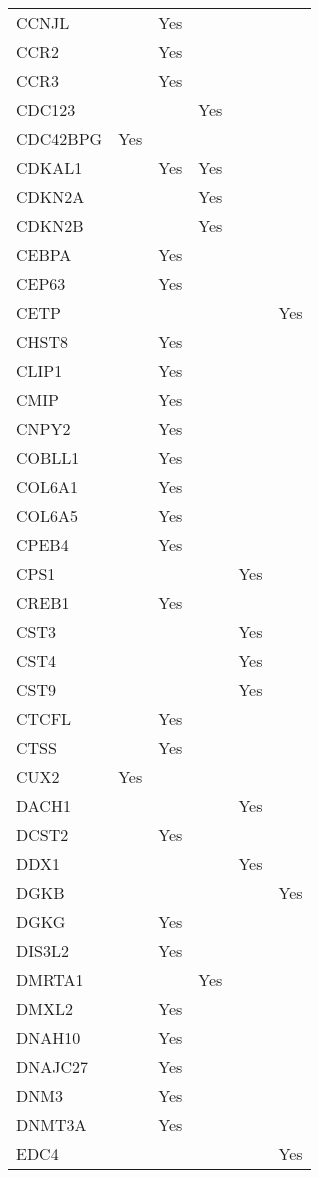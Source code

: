\documentclass[twoside,openright]{report}
\begin{document}
\begin{appendices}
\begin{longtable}[t]{llllll}
CCNJL &  & Yes &  &  & \\
CCR2 &  & Yes &  &  & \\
CCR3 &  & Yes &  &  & \\
CDC123 &  &  & Yes &  & \\
CDC42BPG & Yes &  &  &  & \\
CDKAL1 &  & Yes & Yes &  & \\
CDKN2A &  &  & Yes &  & \\
CDKN2B &  &  & Yes &  & \\
CEBPA &  & Yes &  &  & \\
CEP63 &  & Yes &  &  & \\
CETP &  &  &  &  & Yes\\
CHST8 &  & Yes &  &  & \\
CLIP1 &  & Yes &  &  & \\
CMIP &  & Yes &  &  & \\
CNPY2 &  & Yes &  &  & \\
COBLL1 &  & Yes &  &  & \\
COL6A1 &  & Yes &  &  & \\
COL6A5 &  & Yes &  &  & \\
CPEB4 &  & Yes &  &  & \\
CPS1 &  &  &  & Yes & \\
CREB1 &  & Yes &  &  & \\
CST3 &  &  &  & Yes & \\
CST4 &  &  &  & Yes & \\
CST9 &  &  &  & Yes & \\
CTCFL &  & Yes &  &  & \\
CTSS &  & Yes &  &  & \\
CUX2 & Yes &  &  &  & \\
DACH1 &  &  &  & Yes & \\
DCST2 &  & Yes &  &  & \\
DDX1 &  &  &  & Yes & \\
DGKB &  &  &  &  & Yes\\
DGKG &  & Yes &  &  & \\
DIS3L2 &  & Yes &  &  & \\
DMRTA1 &  &  & Yes &  & \\
DMXL2 &  & Yes &  &  & \\
DNAH10 &  & Yes &  &  & \\
DNAJC27 &  & Yes &  &  & \\
DNM3 &  & Yes &  &  & \\
DNMT3A &  & Yes &  &  & \\
EDC4 &  &  &  &  & Yes\\

\end{longtable}
\end{appendices}
\end{document}
